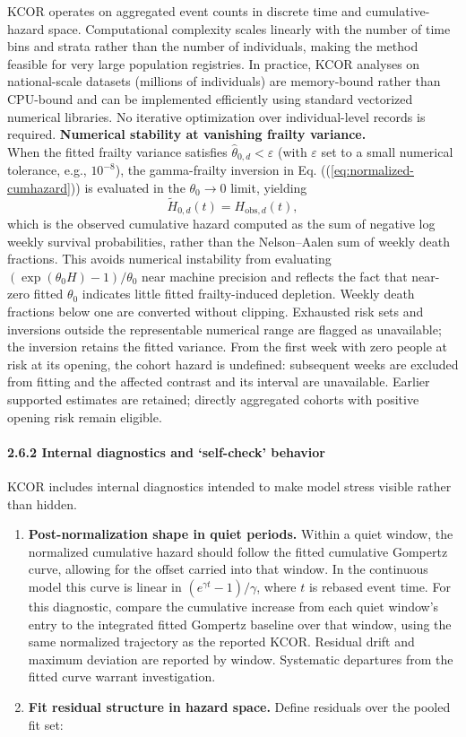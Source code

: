 \documentclass[
]{article}
\begin{document}
KCOR operates on aggregated event counts in discrete time and cumulative-hazard space. Computational complexity scales linearly with the number of time bins and strata rather than the number of individuals, making the method feasible for very large population registries. In practice, KCOR analyses on national-scale datasets (millions of individuals) are memory-bound rather than CPU-bound and can be implemented efficiently using standard vectorized numerical libraries. No iterative optimization over individual-level records is required. \textbf{Numerical stability at vanishing frailty variance.}\\
When the fitted frailty variance satisfies \(\hat\theta_{0,d} < \varepsilon\) (with \(\varepsilon\) set to a small numerical tolerance, e.g., \(10^{-8}\)), the gamma-frailty inversion in Eq. ((\ref{eq:normalized-cumhazard})) is evaluated in the \(\theta_0 \to 0\) limit, yielding \[\tilde H_{0,d}(t)=H_{\mathrm{obs},d}(t),\] which is the observed cumulative hazard computed as the sum of negative log weekly survival probabilities, rather than the Nelson--Aalen sum of weekly death fractions. This avoids numerical instability from evaluating \((\exp(\theta_0 H)-1)/\theta_0\) near machine precision and reflects the fact that near-zero fitted \(\theta_0\) indicates little fitted frailty-induced depletion. Weekly death fractions below one are converted without clipping. Exhausted risk sets and inversions outside the representable numerical range are flagged as unavailable; the inversion retains the fitted variance. From the first week with zero people at risk at its opening, the cohort hazard is undefined: subsequent weeks are excluded from fitting and the affected contrast and its interval are unavailable. Earlier supported estimates are retained; directly aggregated cohorts with positive opening risk remain eligible.

\paragraph{2.6.2 Internal diagnostics and `self-check' behavior}\label{internal-diagnostics-and-self-check-behavior}

KCOR includes internal diagnostics intended to make model stress visible rather than hidden.

\begin{enumerate}
\def\labelenumi{\arabic{enumi}.}
\item
  \textbf{Post-normalization shape in quiet periods.} Within a quiet window, the normalized cumulative hazard should follow the fitted cumulative Gompertz curve, allowing for the offset carried into that window. In the continuous model this curve is linear in \((e^{\gamma t}-1)/\gamma\), where \(t\) is rebased event time. For this diagnostic, compare the cumulative increase from each quiet window's entry to the integrated fitted Gompertz baseline over that window, using the same normalized trajectory as the reported KCOR. Residual drift and maximum deviation are reported by window. Systematic departures from the fitted curve warrant investigation.
\item
  \textbf{Fit residual structure in hazard space.} Define residuals over the pooled fit set:
\end{enumerate}
\end{document}
